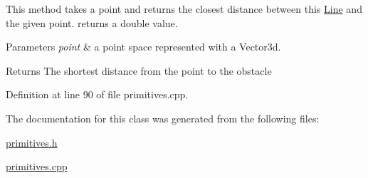 This method takes a point and returns the closest distance between this \hyperlink{class_line}{Line} and the given point. returns a double value.


\begin{DoxyParams}{Parameters}
{\em point} & a point space represented with a Vector3d. \\
\hline
\end{DoxyParams}
\begin{DoxyReturn}{Returns}
The shortest distance from the point to the obstacle 
\end{DoxyReturn}


Definition at line 90 of file primitives.\+cpp.



The documentation for this class was generated from the following files\+:\begin{DoxyCompactItemize}
\item 
\hyperlink{primitives_8h}{primitives.\+h}\item 
\hyperlink{primitives_8cpp}{primitives.\+cpp}\end{DoxyCompactItemize}
